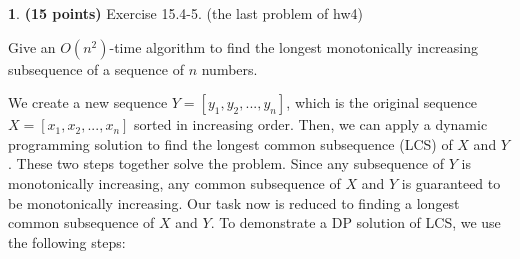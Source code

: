 \documentclass[11pt]{article}
\theoremstyle{definition}
\theoremstyle{theorem}
\newtheorem{prob}{}
\newcommand{\solution}{\medskip\noindent{\color{DarkBlue}\textbf{Solution:}}}
\begin{document}
\newpage
\begin{prob} \textbf{(15 points)} Exercise 15.4-5. (the last problem of hw4)
\end{prob}
Give an $O(n^2)$-time algorithm to find the longest monotonically increasing subsequence of a sequence of $n$ numbers.

\solution

We create a new sequence $Y = [y_1, y_2, ..., y_n]$, which is the original sequence $X = [x_1, x_2, ..., x_n]$ sorted in increasing order. Then, we can apply a dynamic programming solution to find the longest common subsequence (LCS) of $X$ and $Y$. These two steps together solve the problem. Since any subsequence of $Y$ is monotonically increasing, any common subsequence of $X$ and $Y$ is guaranteed to be    monotonically increasing. Our task now is reduced to finding a longest common subsequence of $X$ and $Y$. To demonstrate a DP solution of LCS, we use the following steps:
\end{document}
